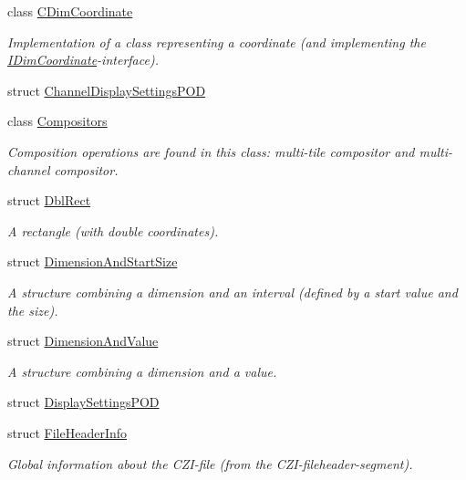 \begin{DoxyCompactItemize}
class \hyperlink{classlib_c_z_i_1_1_c_dim_coordinate}{C\+Dim\+Coordinate}
\begin{DoxyCompactList}\small\item\em Implementation of a class representing a coordinate (and implementing the {\ttfamily \hyperlink{classlib_c_z_i_1_1_i_dim_coordinate}{I\+Dim\+Coordinate}}-\/interface). \end{DoxyCompactList}\item 
struct \hyperlink{structlib_c_z_i_1_1_channel_display_settings_p_o_d}{Channel\+Display\+Settings\+P\+OD}
\item 
class \hyperlink{classlib_c_z_i_1_1_compositors}{Compositors}
\begin{DoxyCompactList}\small\item\em Composition operations are found in this class\+: multi-\/tile compositor and multi-\/channel compositor. \end{DoxyCompactList}\item 
struct \hyperlink{structlib_c_z_i_1_1_dbl_rect}{Dbl\+Rect}
\begin{DoxyCompactList}\small\item\em A rectangle (with double coordinates). \end{DoxyCompactList}\item 
struct \hyperlink{structlib_c_z_i_1_1_dimension_and_start_size}{Dimension\+And\+Start\+Size}
\begin{DoxyCompactList}\small\item\em A structure combining a dimension and an interval (defined by a start value and the size). \end{DoxyCompactList}\item 
struct \hyperlink{structlib_c_z_i_1_1_dimension_and_value}{Dimension\+And\+Value}
\begin{DoxyCompactList}\small\item\em A structure combining a dimension and a value. \end{DoxyCompactList}\item 
struct \hyperlink{structlib_c_z_i_1_1_display_settings_p_o_d}{Display\+Settings\+P\+OD}
\item 
struct \hyperlink{structlib_c_z_i_1_1_file_header_info}{File\+Header\+Info}
\begin{DoxyCompactList}\small\item\em Global information about the C\+Z\+I-\/file (from the C\+Z\+I-\/fileheader-\/segment). \end{DoxyCompactList}\item 

\end{DoxyCompactItemize}
